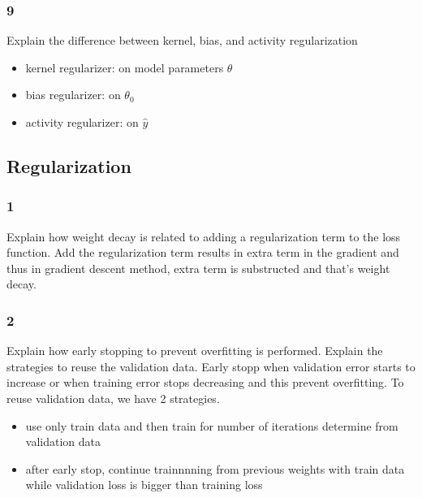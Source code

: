 \documentclass{article}
\begin{document}
\subsubsection*{9}
\begin{myleftlinebox}
    Explain the difference between kernel, bias, and activity regularization
    \tcblower
    \begin{itemize}
        \item kernel regularizer: on model parameters $\theta$
        \item bias regularizer: on $\theta_0$
        \item activity regularizer: on \(\hat y\)
    \end{itemize}
\end{myleftlinebox}

\subsection*{Regularization}
\subsubsection*{1}
\begin{myleftlinebox}
    Explain how weight decay is related to adding a regularization term to the loss function.
    \tcblower
    Add the regularization term results in extra term in the gradient and thus in gradient descent method, extra term is substructed and that's weight decay.
\end{myleftlinebox}

\subsubsection*{2}
\begin{myleftlinebox}
    Explain how early stopping to prevent overfitting is performed. Explain the strategies to reuse the validation data.
    \tcblower
    Early stopp when validation error starts to increase or when training error stops decreasing and this prevent overfitting. 
    To reuse validation data, we have 2 strategies.
    \begin{itemize}
        \item use only train data and then train for number of iterations determine from validation data
        \item after early stop, continue trainnnning from previous weights with train data while validation loss is bigger than training loss
    \end{itemize}
\end{myleftlinebox}
\end{document}
